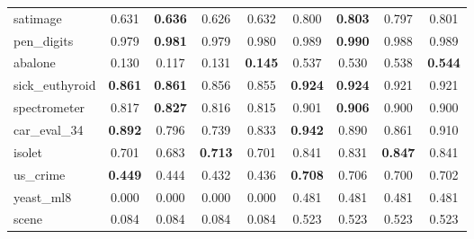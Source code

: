 \begin{figure}[ht]
\begin{tabular}{p{22mm}|*4{p{14mm}}|*4{p{14mm}}}
        satimage&\multicolumn{1}{c}{0.631}&\multicolumn{1}{c}{\textbf{0.636}}&\multicolumn{1}{c}{0.626}&\multicolumn{1}{c|}{0.632}&\multicolumn{1}{c}{0.800}&\multicolumn{1}{c}{\textbf{0.803}}&\multicolumn{1}{c}{0.797}&\multicolumn{1}{c}{0.801}\\
        pen\_digits&\multicolumn{1}{c}{0.979}&\multicolumn{1}{c}{\textbf{0.981}}&\multicolumn{1}{c}{0.979}&\multicolumn{1}{c|}{0.980}&\multicolumn{1}{c}{0.989}&\multicolumn{1}{c}{\textbf{0.990}}&\multicolumn{1}{c}{0.988}&\multicolumn{1}{c}{0.989}\\
        abalone&\multicolumn{1}{c}{0.130}&\multicolumn{1}{c}{0.117}&\multicolumn{1}{c}{0.131}&\multicolumn{1}{c|}{\textbf{0.145}}&\multicolumn{1}{c}{0.537}&\multicolumn{1}{c}{0.530}&\multicolumn{1}{c}{0.538}&\multicolumn{1}{c}{\textbf{0.544}}\\
        sick\_euthyroid&\multicolumn{1}{c}{\textbf{0.861}}&\multicolumn{1}{c}{\textbf{0.861}}&\multicolumn{1}{c}{0.856}&\multicolumn{1}{c|}{0.855}&\multicolumn{1}{c}{\textbf{0.924}}&\multicolumn{1}{c}{\textbf{0.924}}&\multicolumn{1}{c}{0.921}&\multicolumn{1}{c}{0.921}\\
        spectrometer&\multicolumn{1}{c}{0.817}&\multicolumn{1}{c}{\textbf{0.827}}&\multicolumn{1}{c}{0.816}&\multicolumn{1}{c|}{0.815}&\multicolumn{1}{c}{0.901}&\multicolumn{1}{c}{\textbf{0.906}}&\multicolumn{1}{c}{0.900}&\multicolumn{1}{c}{0.900}\\
        car\_eval\_34&\multicolumn{1}{c}{\textbf{0.892}}&\multicolumn{1}{c}{0.796}&\multicolumn{1}{c}{0.739}&\multicolumn{1}{c|}{0.833}&\multicolumn{1}{c}{\textbf{0.942}}&\multicolumn{1}{c}{0.890}&\multicolumn{1}{c}{0.861}&\multicolumn{1}{c}{0.910}\\
        isolet&\multicolumn{1}{c}{0.701}&\multicolumn{1}{c}{0.683}&\multicolumn{1}{c}{\textbf{0.713}}&\multicolumn{1}{c|}{0.701}&\multicolumn{1}{c}{0.841}&\multicolumn{1}{c}{0.831}&\multicolumn{1}{c}{\textbf{0.847}}&\multicolumn{1}{c}{0.841}\\
        us\_crime&\multicolumn{1}{c}{\textbf{0.449}}&\multicolumn{1}{c}{0.444}&\multicolumn{1}{c}{0.432}&\multicolumn{1}{c|}{0.436}&\multicolumn{1}{c}{\textbf{0.708}}&\multicolumn{1}{c}{0.706}&\multicolumn{1}{c}{0.700}&\multicolumn{1}{c}{0.702}\\
        yeast\_ml8&\multicolumn{1}{c}{0.000}&\multicolumn{1}{c}{0.000}&\multicolumn{1}{c}{0.000}&\multicolumn{1}{c|}{0.000}&\multicolumn{1}{c}{0.481}&\multicolumn{1}{c}{0.481}&\multicolumn{1}{c}{0.481}&\multicolumn{1}{c}{0.481}\\
        scene&\multicolumn{1}{c}{0.084}&\multicolumn{1}{c}{0.084}&\multicolumn{1}{c}{0.084}&\multicolumn{1}{c|}{0.084}&\multicolumn{1}{c}{0.523}&\multicolumn{1}{c}{0.523}&\multicolumn{1}{c}{0.523}&\multicolumn{1}{c}{0.523}\\

\end{tabular}
\end{figure}
